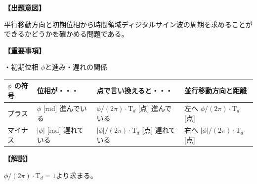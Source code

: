 \noindent \textbf{【出題意図】}

\bigskip
\noindent 平行移動方向と初期位相から時間領域ディジタルサイン波の周期を求めることができるかどうかを確かめる問題である。

\vspace{1em}
\noindent \textbf{【重要事項】}

\noindent ・初期位相 $\phi$と進み・遅れの関係

\medskip
\begin{center}
\small
\begin{tabularx}{0.9\fbwidth}{|X|X|X|X|}
\hline
$\phi$ の符号&  位相が・・・   & 点で言い換えると・・・   & 並行移動方向と距離 \\
\hline
プラス &  $\phi$ [rad] 進んでいる & $\phi/(2\pi) \cdot \textrm{T}_d$ [点] 進んでいる & 左へ $\phi/(2\pi) \cdot \textrm{T}_d$ [点] \\
\hline
マイナス &  $|\phi|$ [rad] 遅れている & $|\phi|/(2\pi) \cdot \textrm{T}_d$ [点] 遅れている & 右へ $|\phi|/(2\pi) \cdot \textrm{T}_d$ [点] \\
\hline
\end{tabularx}
\end{center}

\bigskip

\vspace{1em}
\noindent \textbf{【解説】}

\bigskip
\noindent $\phi/(2\pi) \cdot \textrm{T}_d = 1$より求まる。
